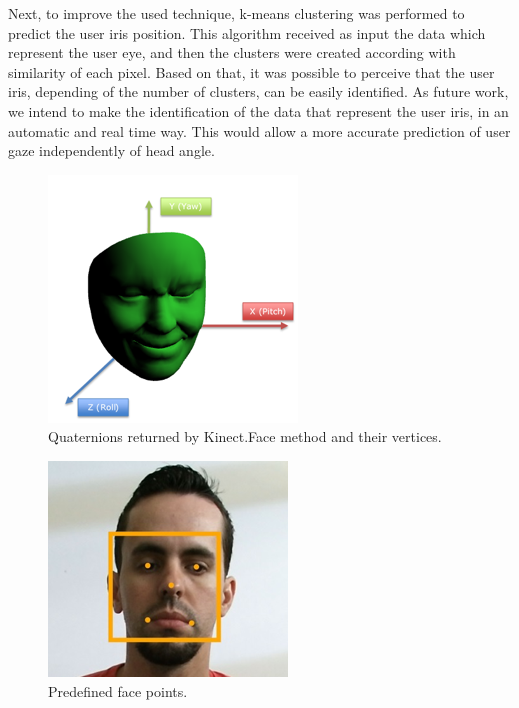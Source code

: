 \documentclass[10pt, conference]{IEEEtran}
\begin{document}
Next, to improve the used technique, k-means clustering was performed to predict the user iris position. 
This algorithm received as input the data which represent the user eye, and then the clusters were created according with similarity of each pixel. 
Based on that, it was possible to perceive that the user iris, depending of the number of clusters, can be easily identified.
As future work, we intend to make the identification of the data that represent the user iris, in an automatic and real time way. 
This would allow a more accurate prediction of user gaze independently of head angle.

\begin{figure}[t]
	\centering
	\includegraphics{figures/pic4.png}
    \caption{Quaternions returned by Kinect.Face method and their vertices.}
    \label{fig:fig4}
\end{figure}

\begin{figure}[t]
	\centering
	\includegraphics{figures/pic5.png}
    \caption{Predefined face points.}
    \label{fig:fig5}
\end{figure}
\end{document}
